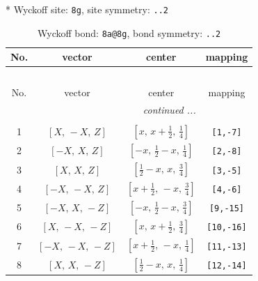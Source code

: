 \documentclass[fleqn,8pt]{jsarticle}
\begin{document}
* Wyckoff site: {\tt 8g}, site symmetry: {\tt ..2}
\renewcommand{\arraystretch}{1.2}
\begin{longtable}{cccc}
\caption{Wyckoff bond: {\tt 8a@8g}, bond symmetry: {\tt ..2}}
 \\
 \hline \hline
No. & vector & center & mapping \\ \hline \endfirsthead

\multicolumn{3}{l}{\tablename\ \thetable{}} \\
 \hline \hline
No. & vector & center & mapping \\ \hline \endhead

 \hline \hline
\multicolumn{3}{r}{\footnotesize\it continued ...} \\ \endfoot

 \hline \hline
\multicolumn{3}{r}{} \\ \endlastfoot

1 & $\left[ X,\, - X,\, Z \right]$ & $\left[ x,\, x + \frac{1}{2},\, \frac{1}{4} \right]$ & {\tt [1,-7]} \\ \hline
2 & $\left[ - X,\, X,\, Z \right]$ & $\left[ - x,\, \frac{1}{2} - x,\, \frac{1}{4} \right]$ & {\tt [2,-8]} \\ \hline
3 & $\left[ X,\, X,\, Z \right]$ & $\left[ \frac{1}{2} - x,\, x,\, \frac{3}{4} \right]$ & {\tt [3,-5]} \\ \hline
4 & $\left[ - X,\, - X,\, Z \right]$ & $\left[ x + \frac{1}{2},\, - x,\, \frac{3}{4} \right]$ & {\tt [4,-6]} \\ \hline
5 & $\left[ - X,\, X,\, - Z \right]$ & $\left[ - x,\, \frac{1}{2} - x,\, \frac{3}{4} \right]$ & {\tt [9,-15]} \\ \hline
6 & $\left[ X,\, - X,\, - Z \right]$ & $\left[ x,\, x + \frac{1}{2},\, \frac{3}{4} \right]$ & {\tt [10,-16]} \\ \hline
7 & $\left[ - X,\, - X,\, - Z \right]$ & $\left[ x + \frac{1}{2},\, - x,\, \frac{1}{4} \right]$ & {\tt [11,-13]} \\ \hline
8 & $\left[ X,\, X,\, - Z \right]$ & $\left[ \frac{1}{2} - x,\, x,\, \frac{1}{4} \right]$ & {\tt [12,-14]} \\
\end{longtable}
\renewcommand{\arraystretch}{1.2}
\end{document}
